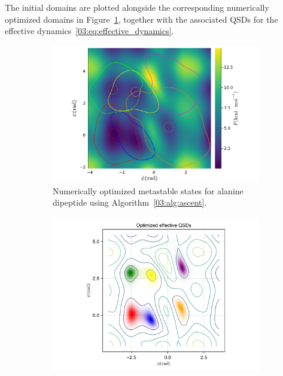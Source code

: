 The initial domains are plotted alongside the corresponding numerically optimized domains in Figure~\ref{03:fig:opt_domains_diala}, together with the associated QSDs for the effective dynamics~\eqref{03:eq:effective_dynamics}.
\begin{figure}
    \begin{subfigure}{0.5\linewidth}
        \center
            \includegraphics[width=\linewidth]{figures/03/shape_optim_diala/opt_domains.pdf}
            \caption[]{Numerically optimized metastable states for alanine dipeptide using Algorithm~\ref{03:alg:ascent}.}
            \label{03:fig:opt_domains_diala}
        \end{subfigure}  
        \begin{subfigure}{0.5\linewidth}  
            \includegraphics[width=\linewidth]{figures/03/shape_optim_diala/qsds.png}

\end{subfigure}
\end{figure}
